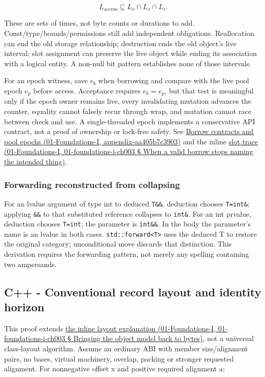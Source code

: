 \[
L_{\mathrm{access}}\subseteq L_o\cap L_s\cap L_i.
\]

These are sets of times, not byte counts or durations to add. Const/type/bounds/permissions still add independent obligations. Reallocation can end the old storage relationship; destruction ends the old object's live interval; slot assignment can preserve the live object while ending its association with a logical entity. A non-null bit pattern establishes none of those intervals.

For an epoch witness, save \(e_b\) when borrowing and compare with the live pool epoch \(e_p\) before access. Acceptance requires \(e_b=e_p\), but that test is meaningful only if the epoch owner remains live, every invalidating mutation advances the counter, equality cannot falsely recur through wrap, and mutation cannot race between check and use. A single-threaded epoch implements a conservative API contract, not a proof of ownership or lock-free safety. See \href{}{Borrow contracts and pool epochs (01-Foundations-I, appendix-aa405b7c3903)} and the inline \href{}{slot trace (01-Foundations-I, 01-foundations-i-ch003 § When a valid borrow stops naming the intended thing)}.

\subsubsection{Forwarding reconstructed from collapsing}\label{forwarding-reconstructed-from-collapsing}

For an lvalue argument of type int to deduced \texttt{T\&\&}, deduction chooses \texttt{T=int\&}; applying \texttt{\&\&} to that substituted reference collapses to \texttt{int\&}. For an int prvalue, deduction chooses \texttt{T=int}; the parameter is \texttt{int\&\&}. In the body the parameter's name is an lvalue in both cases. \texttt{std::forward\textless{}T\textgreater{}} uses the deduced T to restore the original category; unconditional move discards that distinction. This derivation requires the forwarding pattern, not merely any spelling containing two ampersands.

\subsection{C++ - Conventional record layout and identity horizon}\label{c---conventional-record-layout-and-identity-horizon}

This proof extends \href{}{the inline layout explanation (01-Foundations-I, 01-foundations-i-ch003 § Bringing the object model back to bytes)}, not a universal class-layout algorithm. Assume an ordinary ABI with member size/alignment pairs, no bases, virtual machinery, overlap, packing or stronger requested alignment. For nonnegative offset x and positive required alignment a:

